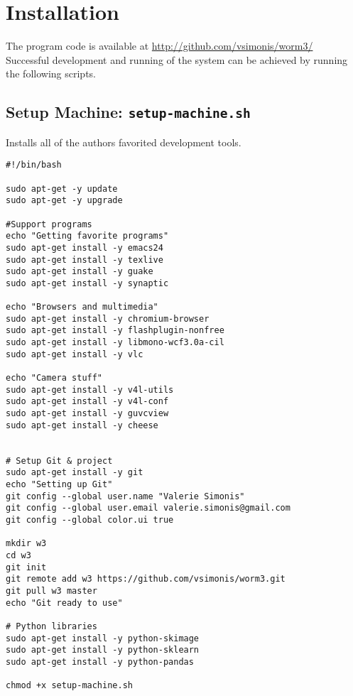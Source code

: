 \documentclass[main.tex]{subfiles}
\begin{document}
\section{Installation}
\label{app:install}
The program code is available at \url{http://github.com/vsimonis/worm3/} \\

Successful development and running of the system can be achieved by running the following scripts.
\subsection{Setup Machine: \textbf{\texttt{setup-machine.sh}}}
Installs all of the authors favorited development tools. 
\\

\begin{lstlisting}
#!/bin/bash

sudo apt-get -y update
sudo apt-get -y upgrade

#Support programs
echo "Getting favorite programs"
sudo apt-get install -y emacs24
sudo apt-get install -y texlive
sudo apt-get install -y guake
sudo apt-get install -y synaptic

echo "Browsers and multimedia"
sudo apt-get install -y chromium-browser
sudo apt-get install -y flashplugin-nonfree
sudo apt-get install -y libmono-wcf3.0a-cil
sudo apt-get install -y vlc

echo "Camera stuff"
sudo apt-get install -y v4l-utils
sudo apt-get install -y v4l-conf
sudo apt-get install -y guvcview
sudo apt-get install -y cheese


# Setup Git & project
sudo apt-get install -y git
echo "Setting up Git"
git config --global user.name "Valerie Simonis"
git config --global user.email valerie.simonis@gmail.com
git config --global color.ui true

mkdir w3
cd w3
git init
git remote add w3 https://github.com/vsimonis/worm3.git
git pull w3 master
echo "Git ready to use"

# Python libraries
sudo apt-get install -y python-skimage
sudo apt-get install -y python-sklearn
sudo apt-get install -y python-pandas

chmod +x setup-machine.sh
\end{lstlisting}
\end{document}
